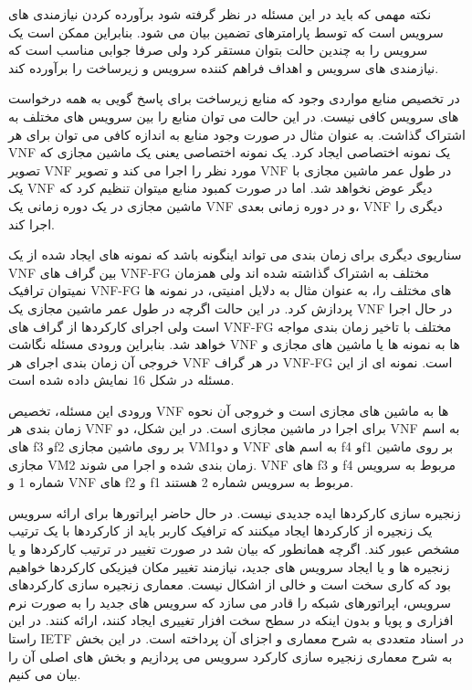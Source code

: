 \documentclass{book}
\begin{document}
نکته مهمی که باید در این مسئله در نظر گرفته شود برآورده کردن نیازمندی های سرویس است که توسط پارامترهای تضمین بیان می شود. بنابراین ممکن است یک سرویس را به چندین حالت بتوان مستقر کرد ولی صرفا جوابی مناسب است که نیازمندی های سرویس و اهداف فراهم کننده سرویس و زیرساخت را برآورده کند.


در تخصیص منابع مواردی وجود که منابع زیرساخت برای پاسخ گویی به همه درخواست های سرویس کافی نیست. در این حالت می توان منابع را بین سرویس های مختلف به اشتراک گذاشت. به عنوان مثال در صورت وجود منابع به اندازه کافی می توان برای هر VNF یک نمونه اختصاصی ایجاد کرد. یک نمونه اختصاصی یعنی یک ماشین مجازی که تصویر VNF مورد نظر را اجرا می کند و تصویر VNF در طول عمر ماشین مجازی با یک VNF دیگر عوض نخواهد شد. اما در صورت کمبود منابع میتوان تنظیم کرد که ماشین مجازی در یک دوره زمانی یک VNF و در دوره زمانی بعدی، VNF دیگری را اجرا کند.

سناریوی دیگری برای زمان بندی می تواند اینگونه باشد که نمونه های ایجاد شده از یک VNF بین گراف های VNF-FG مختلف به اشتراک گذاشته شده اند ولی همزمان نمیتوان ترافیک  VNF-FG های مختلف را، به عنوان مثال به دلایل امنیتی، در نمونه ها پردازش کرد. در این حالت اگرچه در طول عمر ماشین مجازی یک VNF در حال اجرا است ولی اجرای کارکردها از گراف های VNF-FG مختلف با تاخیر زمان بندی مواجه خواهد شد. بنابراین ورودی مسئله نگاشت VNF ها به نمونه ها یا ماشین های مجازی و خروجی آن زمان بندی اجرای هر VNF در هر گراف VNF-FG است. نمونه ای از این مسئله در شکل 16 نمایش داده شده است.

ورودی این مسئله، تخصیص VNF ها به ماشین های مجازی است و خروجی آن نحوه زمان بندی هر VNF برای اجرا در ماشین مجازی است. در این شکل، دو VNF به اسم های f3 وf2  بر روی ماشین مجازی VM1و دو VNF به اسم های f4 وf1  بر روی ماشین مجازی VM2 زمان بندی شده و اجرا می شوند. VNF های f3 و f4 مربوط به سرویس شماره 1 و VNF های f2 و f1 مربوط به سرویس شماره 2 هستند.


زنجیره سازی کارکردها ایده جدیدی نیست. در حال حاضر اپراتورها برای ارائه سرویس یک زنجیره از کارکردها ایجاد میکنند که ترافیک کاربر باید از کارکردها با یک ترتیب مشخص عبور کند. اگرچه همانطور که بیان شد در صورت تغییر در ترتیب کارکردها و یا زنجیره ها و یا ایجاد سرویس های جدید، نیازمند تغییر مکان فیزیکی کارکردها خواهیم بود که کاری سخت است و خالی از اشکال نیست. معماری زنجیره سازی کارکردهای سرویس، اپراتورهای شبکه را قادر می سازد که سرویس های جدید را به صورت نرم افزاری و پویا و بدون اینکه در سطح سخت افزار تغییری ایجاد کنند، ارائه کنند. در این راستا IETF در اسناد متعددی به شرح معماری و اجزای آن پرداخته است. در این بخش به شرح معماری زنجیره سازی کارکرد سرویس می پردازیم و بخش های اصلی آن را بیان می کنیم.
\end{document}
